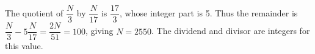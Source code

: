 The quotient of $\dfrac{N}{3}$ by $\dfrac{N}{17}$ is $\dfrac{17}{3}$, whose integer part is 5. Thus the remainder is $\dfrac{N}{3}-5\dfrac{N}{17}=\dfrac{2N}{51}=100$, giving $\boxed{N=2550}$. The dividend and divisor are integers for this value.
